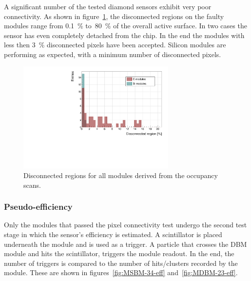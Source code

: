 A significant number of the tested diamond sensors exhibit very poor connectivity. As shown in figure~\ref{fig:disconreg}, the disconnected regions on the faulty modules range from 0.1~\% to~80~\% of the overall active surface. In two cases the sensor has even completely detached from the chip. In the end the modules with less then 3~\% disconnected pixels have been accepted. Silicon modules are performing as expected, with a minimum number of disconnected pixels.


\begin{figure}[!t]
\centering
\includegraphics[width=0.7\textwidth]{../scripts/04_charge_monitoring/plots/disconnectedregion1} \caption{Disconnected regions for all modules derived from the occupancy scans.}
\label{fig:disconreg}
\end{figure}






\subsubsection{Pseudo-efficiency}
Only the modules that passed the pixel connectivity test undergo the second test stage in which the sensor's efficiency is estimated. A scintillator is placed underneath the module and is used as a trigger. A particle that crosses the DBM module and hits the scintillator, triggers the module readout. In the end, the number of triggers is compared to the number of hits/clusters recorded by the module. These are shown in figures~\ref{fig:MSBM-34-eff} and~\ref{fig:MDBM-23-eff}. 

